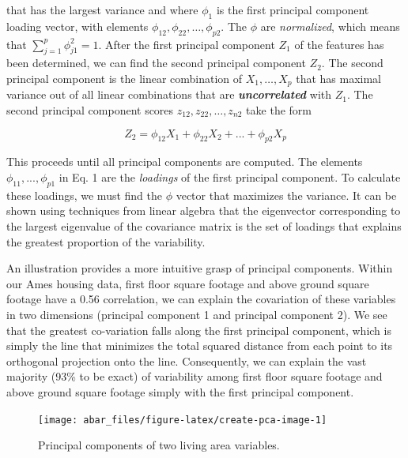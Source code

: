 \documentclass[]{book}
\theoremstyle{definition}
\theoremstyle{definition}
\theoremstyle{definition}
\theoremstyle{remark}
\begin{document}
that has the largest variance and where \(\phi_1\) is the first
principal component loading vector, with elements
\(\phi_{12}, \phi_{22},\dots,\phi_{p2}\). The \(\phi\) are
\emph{normalized}, which means that
\(\sum_{j=1}^{p}{\phi_{j1}^{2}} = 1\). After the first principal
component \(Z_1\) of the features has been determined, we can find the
second principal component \(Z_2\). The second principal component is
the linear combination of \(X_1,\dots , X_p\) that has maximal variance
out of all linear combinations that are \textbf{\emph{uncorrelated}}
with \(Z_1\). The second principal component scores
\(z_{12}, z_{22}, \dots, z_{n2}\) take the form

\begin{equation}
\label{eq:pca2}
Z_{2} = \phi_{12}X_{1} + \phi_{22}X_{2} + ... + \phi_{p2}X_{p}
\end{equation}

This proceeds until all principal components are computed. The elements
\(\phi_{11}, ..., \phi_{p1}\) in Eq. 1 are the \emph{loadings} of the
first principal component. To calculate these loadings, we must find the
\(\phi\) vector that maximizes the variance. It can be shown using
techniques from linear algebra that the eigenvector corresponding to the
largest eigenvalue of the covariance matrix is the set of loadings that
explains the greatest proportion of the variability.

An illustration provides a more intuitive grasp of principal components.
Within our Ames housing data, first floor square footage and above
ground square footage have a 0.56 correlation, we can explain the
covariation of these variables in two dimensions (principal component 1
and principal component 2). We see that the greatest co-variation falls
along the first principal component, which is simply the line that
minimizes the total squared distance from each point to its orthogonal
projection onto the line. Consequently, we can explain the vast majority
(93\% to be exact) of variability among first floor square footage and
above ground square footage simply with the first principal component.

\begin{figure}

{\centering \texttt{[image: abar\_files/figure-latex/create-pca-image-1]} 

}

\caption{Principal components of two living area variables.}\label{fig:create-pca-image}
\end{figure}
\end{document}
